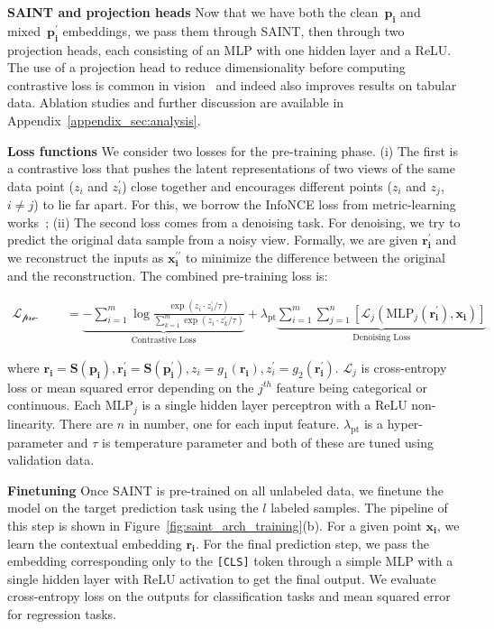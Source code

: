 \textbf{SAINT and projection heads} Now that we have both the clean~$\mathbf{p_i}$ and mixed~$\mathbf{p_i^\prime}$ embeddings, we pass them through SAINT, then through two projection heads, each consisting of an MLP with one hidden layer and a ReLU. The use of a projection head to reduce dimensionality before computing contrastive loss is common in vision~\citep{chen2020simple,he2020momentum,grill2020bootstrap} and indeed also improves results on tabular data. Ablation studies and further discussion are available in Appendix~\ref{appendix_sec:analysis}.

\textbf{Loss functions} We consider two losses for the pre-training phase. (i) The first is a contrastive loss that pushes the latent representations of two views of the same data point ($z_i$ and $z_i^\prime$) close together and encourages different points ($z_i$ and $z_j$, $i\neq j$) to lie far apart.  For this, we borrow the InfoNCE loss from metric-learning works~\citep{sohn2016improved,oord2018representation,chen2020simple, wu2018unsupervised}; (ii) The second loss comes from a denoising task. For denoising, we try to predict the original data sample from a noisy view. Formally, we are given $\mathbf{r_i^\prime}$ and we reconstruct the inputs as $\mathbf{x_i^{\prime \prime}}$ to minimize the difference between the original and the reconstruction. The combined pre-training loss is:

\begin{align}

\mathcal{L_\text{pre-training}} &= \underbrace{-\sum_{i=1}^{m}{\log{\frac{\exp(z_i \cdot z_i^\prime/\tau)}{\sum_{k=1}^{m}{\exp(z_i \cdot z_k^\prime/\tau)}}}}}_{\text{Contrastive Loss}} + \lambda_{\text{pt}} \underbrace{\sum_{i=1}^{m}\sum_{j=1}^{n} [\mathcal{L}_j(\text{MLP}_j(\mathbf{r_i^\prime}),\mathbf{x_i})]}_{\text{Denoising Loss}}
\end{align}

where $\mathbf{r_i} = \mathbf{S}(\mathbf{p_i}), \mathbf{r_i^\prime} = \mathbf{S}(\mathbf{p_i^\prime}), z_i = g_1(\mathbf{r_i}),z_i^\prime = g_2(\mathbf{r_i^\prime}) $. $\mathcal{L}_j$ is cross-entropy loss or mean squared error depending on the $j^{th}$ feature being categorical or continuous. Each $\text{MLP}_j$ is a single hidden layer perceptron with a ReLU non-linearity. There are $n$ in number, one for each input feature. $\lambda_{\text{pt}}$ is a hyper-parameter and $\tau$ is temperature parameter and both of these are tuned using validation data.

\textbf{Finetuning} Once SAINT is pre-trained on all unlabeled data, we finetune the model on the target prediction task using the $l$ labeled samples.  The pipeline of this step is shown in Figure~\ref{fig:saint_arch_training}(b). For a given point $\mathbf{x_i}$, we learn the contextual embedding $\mathbf{r_i}$. For the final prediction step, we pass the embedding corresponding only to the \verb|[CLS]| token through a simple MLP with a single hidden layer with ReLU activation to get the final output. We evaluate cross-entropy loss on the outputs for classification tasks and mean squared error for regression tasks.

